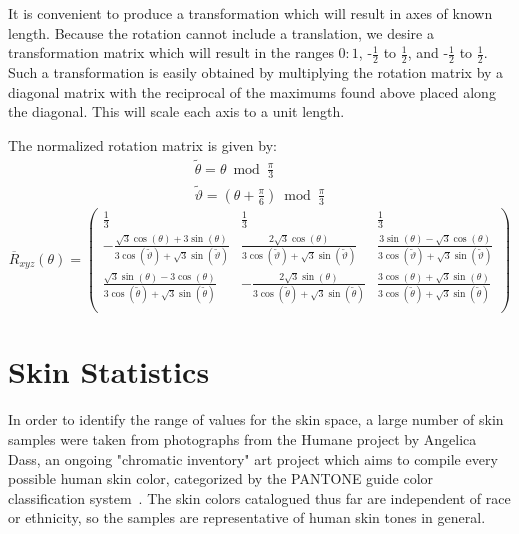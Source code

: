 It is convenient to produce a transformation which will result in axes of known length. Because the rotation cannot include a translation, we desire a transformation matrix which will result in the ranges $0:1$, -$\frac{1}2$ to $\frac{1}2$, and -$\frac{1}2$ to $\frac{1}2$. Such a transformation is easily obtained by multiplying the rotation matrix by a diagonal matrix with the reciprocal of the maximums found above placed along the diagonal. This will scale each axis to a unit length.

The normalized rotation matrix is given by:
\begin{gather*}
  \widetilde{\theta} = \theta  \bmod \frac{\pi }{3} \\
\widetilde{\vartheta} = \left(\theta +\frac{\pi }{6}\right) \bmod \frac{\pi }{3}
\end{gather*}
\begin{equation}\label{eq:NormRxyz}
\overline{R}_{xyz}(\theta) =
\left(
\begin{array}{ccc}
 \frac{1}{3} & \frac{1}{3} & \frac{1}{3} \\
 -\frac{\sqrt{3} \cos (\theta )+3 \sin (\theta )}{3 \cos \left(\widetilde{\vartheta}\right)+\sqrt{3} \sin \left(\widetilde{\vartheta}\right)} & \frac{2 \sqrt{3} \cos (\theta )}{3 \cos \left(\widetilde{\vartheta}\right)+\sqrt{3} \sin \left(\widetilde{\vartheta}\right)} & \frac{3 \sin (\theta )-\sqrt{3} \cos (\theta )}{3 \cos \left(\widetilde{\vartheta}\right)+\sqrt{3} \sin \left(\widetilde{\vartheta}\right)} \\
 \frac{\sqrt{3} \sin (\theta )-3 \cos (\theta )}{3 \cos \left(\widetilde{\theta}\right)+\sqrt{3} \sin \left(\widetilde{\theta}\right)} & -\frac{2 \sqrt{3} \sin (\theta )}{3 \cos \left(\widetilde{\theta}\right)+\sqrt{3} \sin \left(\widetilde{\theta}\right)} & \frac{3 \cos (\theta )+\sqrt{3} \sin (\theta )}{3 \cos \left(\widetilde{\theta}\right)+\sqrt{3} \sin \left(\widetilde{\theta}\right)} \\
\end{array}
\right)
\end{equation}

\section{Skin Statistics}\label{sec:SkinStatistics}

In order to identify the range of values for the skin space, a large number of skin samples were taken from photographs from the Humane project by Angelica Dass, an ongoing "chromatic inventory" art project which aims to compile every possible human skin color, categorized by the PANTONE guide color classification system~\cite{Dass2012}. The skin colors catalogued thus far are independent of race or ethnicity, so the samples are representative of human skin tones in general.

